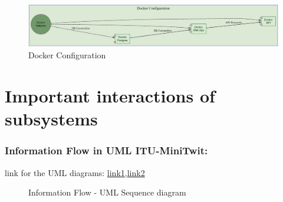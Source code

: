\documentclass[12pt, a4paper, oneside]{book}
\begin{document}
\begin{spacing}{1.5}
\begin{itemize}
\end{itemize}

\begin{figure}[h]
    \centering
    \includegraphics[width=\textwidth]{images/dockerconfig.png}
    \caption{Docker Configuration}
\end{figure}


\section{Important interactions of subsystems}

\subsubsection{Information Flow in UML ITU-MiniTwit:}

link for the UML diagrams: \href{https://drive.google.com/file/d/1xU3Uf7EZC5fq4Bzw-O73jOwjMg971a8d/view?usp=sharing}{link1},\href{https://drive.google.com/file/d/1vgYJsYiDPGsxxs7oxMblu9runmONP_LT/view?usp=sharing}{link2}

\begin{figure}[H]
    \centering
    \caption{Information Flow - UML Sequence diagram}
    
\end{figure}


\end{spacing}
\end{document}
